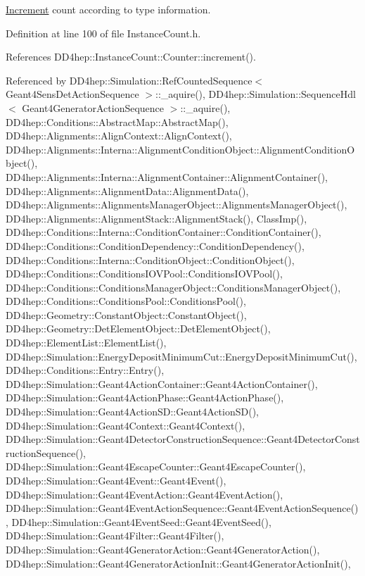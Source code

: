\hyperlink{struct_d_d4hep_1_1_increment}{Increment} count according to type information. 



Definition at line 100 of file Instance\+Count.\+h.



References D\+D4hep\+::\+Instance\+Count\+::\+Counter\+::increment().



Referenced by D\+D4hep\+::\+Simulation\+::\+Ref\+Counted\+Sequence$<$ Geant4\+Sens\+Det\+Action\+Sequence $>$\+::\+\_\+aquire(), D\+D4hep\+::\+Simulation\+::\+Sequence\+Hdl$<$ Geant4\+Generator\+Action\+Sequence $>$\+::\+\_\+aquire(), D\+D4hep\+::\+Conditions\+::\+Abstract\+Map\+::\+Abstract\+Map(), D\+D4hep\+::\+Alignments\+::\+Align\+Context\+::\+Align\+Context(), D\+D4hep\+::\+Alignments\+::\+Interna\+::\+Alignment\+Condition\+Object\+::\+Alignment\+Condition\+Object(), D\+D4hep\+::\+Alignments\+::\+Interna\+::\+Alignment\+Container\+::\+Alignment\+Container(), D\+D4hep\+::\+Alignments\+::\+Alignment\+Data\+::\+Alignment\+Data(), D\+D4hep\+::\+Alignments\+::\+Alignments\+Manager\+Object\+::\+Alignments\+Manager\+Object(), D\+D4hep\+::\+Alignments\+::\+Alignment\+Stack\+::\+Alignment\+Stack(), Class\+Imp(), D\+D4hep\+::\+Conditions\+::\+Interna\+::\+Condition\+Container\+::\+Condition\+Container(), D\+D4hep\+::\+Conditions\+::\+Condition\+Dependency\+::\+Condition\+Dependency(), D\+D4hep\+::\+Conditions\+::\+Interna\+::\+Condition\+Object\+::\+Condition\+Object(), D\+D4hep\+::\+Conditions\+::\+Conditions\+I\+O\+V\+Pool\+::\+Conditions\+I\+O\+V\+Pool(), D\+D4hep\+::\+Conditions\+::\+Conditions\+Manager\+Object\+::\+Conditions\+Manager\+Object(), D\+D4hep\+::\+Conditions\+::\+Conditions\+Pool\+::\+Conditions\+Pool(), D\+D4hep\+::\+Geometry\+::\+Constant\+Object\+::\+Constant\+Object(), D\+D4hep\+::\+Geometry\+::\+Det\+Element\+Object\+::\+Det\+Element\+Object(), D\+D4hep\+::\+Element\+List\+::\+Element\+List(), D\+D4hep\+::\+Simulation\+::\+Energy\+Deposit\+Minimum\+Cut\+::\+Energy\+Deposit\+Minimum\+Cut(), D\+D4hep\+::\+Conditions\+::\+Entry\+::\+Entry(), D\+D4hep\+::\+Simulation\+::\+Geant4\+Action\+Container\+::\+Geant4\+Action\+Container(), D\+D4hep\+::\+Simulation\+::\+Geant4\+Action\+Phase\+::\+Geant4\+Action\+Phase(), D\+D4hep\+::\+Simulation\+::\+Geant4\+Action\+S\+D\+::\+Geant4\+Action\+S\+D(), D\+D4hep\+::\+Simulation\+::\+Geant4\+Context\+::\+Geant4\+Context(), D\+D4hep\+::\+Simulation\+::\+Geant4\+Detector\+Construction\+Sequence\+::\+Geant4\+Detector\+Construction\+Sequence(), D\+D4hep\+::\+Simulation\+::\+Geant4\+Escape\+Counter\+::\+Geant4\+Escape\+Counter(), D\+D4hep\+::\+Simulation\+::\+Geant4\+Event\+::\+Geant4\+Event(), D\+D4hep\+::\+Simulation\+::\+Geant4\+Event\+Action\+::\+Geant4\+Event\+Action(), D\+D4hep\+::\+Simulation\+::\+Geant4\+Event\+Action\+Sequence\+::\+Geant4\+Event\+Action\+Sequence(), D\+D4hep\+::\+Simulation\+::\+Geant4\+Event\+Seed\+::\+Geant4\+Event\+Seed(), D\+D4hep\+::\+Simulation\+::\+Geant4\+Filter\+::\+Geant4\+Filter(), D\+D4hep\+::\+Simulation\+::\+Geant4\+Generator\+Action\+::\+Geant4\+Generator\+Action(), D\+D4hep\+::\+Simulation\+::\+Geant4\+Generator\+Action\+Init\+::\+Geant4\+Generator\+Action\+Init(), 